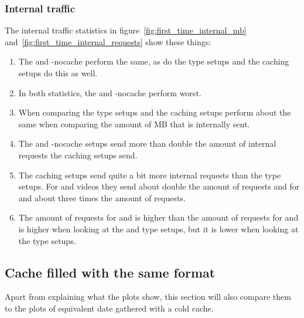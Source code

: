 \documentclass[twoside,openright]{uva-bachelor-thesis}
\begin{document}
\subsubsection{Internal traffic}
The internal traffic statistics in figure~\ref{fig:first_time_internal_mb}
and~\ref{fig:first_time_internal_requests} show these things:
\begin{enumerate}
    \item
        The \ipp and \lt-nocache perform the same, as do the \cdn type setups
        and the caching \lt setups do this as well.

    \item
        In both statistics, the \ipp and \lt-nocache perform worst.

    \item
        When comparing the \cdn type setups and the caching \lt setups perform
        about the same when comparing the amount of MB that is internally sent.

    \item
        The \ipp and \lt-nocache setups send more than double the amount of
        internal requests the caching \lt setups send.

    \item
        The caching \lt setups send quite a bit more internal requests than the
        \cdn type setups. For \dash and \iss videos they send about double the
        amount of requests and for \hds and \hls about three times the amount of
        requests.

    \item
        The amount of requests for \hds and \hls is higher than the amount of
        requests for \dash and \iss is higher when looking at the \ipp and \lt
        type setups, but it is lower when looking at the \cdn type setups.


\end{enumerate}




\FloatBarrier

\subsection{Cache filled with the same format}
Apart from explaining what the plots show, this section will also compare them
to the plots of equivalent date gathered with a cold cache.
\end{document}
